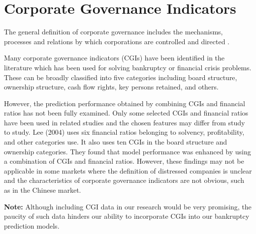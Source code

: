 \section{Corporate Governance Indicators}
\label{sec:CGI}
The general definition of corporate governance includes the mechanisms, processes and relations by which corporations are controlled and directed \cite{shailer2004introduction}. 

Many corporate governance indicators (CGIs) have been identified in the literature which has been used for solving bankruptcy or financial crisis problems. These can be broadly classified into five categories including board structure, ownership structure, cash flow rights, key persons retained, and others. 

However, the prediction performance obtained by combining CGIs and financial ratios has not been fully examined. Only some selected CGIs and financial ratios have been used in related studies and the chosen features may differ from study to study. 
Lee (2004) \cite{lee2004corporate} uses six financial ratios belonging to solvency, profitability, and other categories use. It also uses ten CGIs in the board structure and ownership categories. They found that model performance was enhanced by using a combination of CGIs and financial ratios.
However, these findings may not be applicable in some markets where the definition of distressed companies is unclear and the characteristics of corporate governance indicators are not obvious, such as in the Chinese market.
 
\textbf{Note:} Although including CGI data in our research would be very promising, the paucity of such data hinders our ability to incorporate CGIs into our bankruptcy prediction models.


